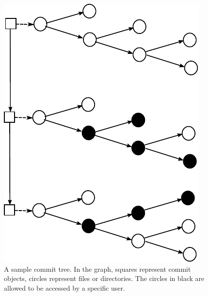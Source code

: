 \begin{figure}[t]
\centerline{\includegraphics{fig/committree.pdf}}
\caption{A sample commit tree. In the graph, squares represent commit objects,
circles represent files or directories. The circles in black are allowed to
be accessed by a specific user.}
\label{f:commit-tree}
\end{figure}

\endinput



